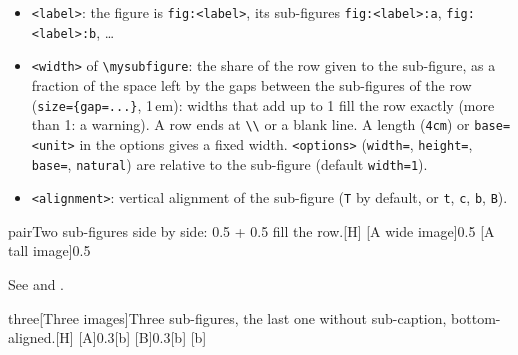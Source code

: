 \documentclass[sectioning=nobreak]{myreport}
\begin{document}

\begin{itemize}
  \item \texttt{<label>}: the figure is \texttt{fig:<label>}, its
    sub-figures \texttt{fig:<label>:a}, \texttt{fig:<label>:b}, \dots
  \item \texttt{<width>} of \verb|\mysubfigure|: the share of the row
    given to the sub-figure, as a fraction of the space left by the gaps
    between the sub-figures of the row (\texttt{size=\{gap=...\}},
    1\,em): widths that add up to 1 fill the row exactly (more than 1: a
    warning). A row ends at \verb|\\| or a blank line. A length
    (\texttt{4cm}) or \texttt{base=<unit>} in the options gives a fixed
    width. \texttt{<options>} (\texttt{width=}, \texttt{height=},
    \texttt{base=}, \texttt{natural}) are relative to the sub-figure
    (default \texttt{width=1}).
  \item \texttt{<alignment>}: vertical alignment of the sub-figure
    (\texttt{T} by default, or \texttt{t}, \texttt{c}, \texttt{b},
    \texttt{B}).
\end{itemize}

\begin{demo}
\begin{mysub}{pair}{Two sub-figures side by side: 0.5 + 0.5 fill the
row.}[H]
  [A wide image]{0.5}
  [A tall image]{0.5}
\end{mysub}
See  and .
\end{demo}

\begin{demo}
\begin{mysub}{three}[Three images]{Three sub-figures, the last one
without sub-caption, bottom-aligned.}[H]
  [A]{0.3}[b]\hfill
  [B]{0.3}[b]\hfill
  [b]
\end{mysub}
\end{demo}
\end{document}
